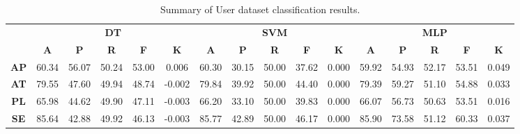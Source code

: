 \begin{landscape}
\begin{table}[htbp]
\footnotesize
\centering
\caption{Summary of User dataset classification results.}
\label{tab:base_female}
\begin{tabular}{|c|c|c|c|c|c|c|c|c|c|c|c|c|c|c|c|}
\hline
\multirow{2}{*}{}	& \multicolumn{5}{c|}{\textbf{DT}}												& \multicolumn{5}{c|}{\textbf{SVM}}												& \multicolumn{5}{c|}{\textbf{MLP}}												\\ \cline{2-16} 
					& \textbf{A}	& \textbf{P}	& \textbf{R}	& \textbf{F}	& \textbf{K}	& \textbf{A}	& \textbf{P}	& \textbf{R}	& \textbf{F}	& \textbf{K}	& \textbf{A}	& \textbf{P}	& \textbf{R}	& \textbf{F}	& \textbf{K}	\\ \hline
\textbf{AP}			& 60.34			& 56.07			& 50.24			& 53.00			& 0.006			& 60.30			& 30.15			& 50.00			& 37.62			& 0.000			& 59.92			& 54.93			& 52.17			& 53.51			& 0.049			\\ \hline
\textbf{AT}			& 79.55			& 47.60			& 49.94			& 48.74			& -0.002			& 79.84			& 39.92			& 50.00			& 44.40			& 0.000			& 79.39			& 59.27			& 51.10			& 54.88			& 0.033			\\ \hline
\textbf{PL}			& 65.98			& 44.62			& 49.90			& 47.11			& -0.003			& 66.20			& 33.10			& 50.00			& 39.83			& 0.000			& 66.07			& 56.73			& 50.63			& 53.51			& 0.016			\\ \hline
\textbf{SE}			& 85.64			& 42.88			& 49.92			& 46.13			& -0.003			& 85.77			& 42.89			& 50.00			& 46.17			& 0.000			& 85.90			& 73.58			& 51.12			& 60.33			& 0.037			\\ \hline
\end{tabular}
\end{table}
\end{landscape}